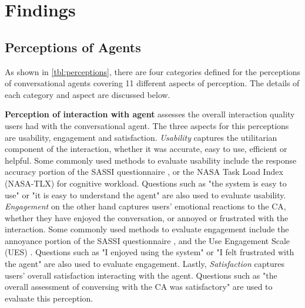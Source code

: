 
\section{Findings}

\subsection{Perceptions of Agents}

As shown in \autoref{tbl:perceptions}, there are four categories defined for the perceptions of conversational agents covering 11 different aspects of perception. The details of each category and aspect are discussed below.

\textbf{Perception of interaction with agent} assesses the overall interaction quality users had with the conversational agent. The three aspects for this perceptions are usability, engagement and satisfaction. \textit{Usability} captures the utilitarian component of the interaction, whether it was accurate, easy to use, efficient or helpful. Some commonly used methods to evaluate usability include the response accuracy portion of the SASSI questionnaire \cite{hone2000towards}, or the NASA Task Load Index (NASA-TLX) \cite{hart1988development} for cognitive workload. Questions such as "the system is easy to use" or "it is easy to understand the agent" are also used to evaluate usability. \textit{Engagement} on the other hand captures users' emotional reactions to the CA, whether they have enjoyed the conversation, or annoyed or frustrated with the interaction. Some commonly used methods to evaluate engagement include the annoyance portion of the SASSI questionnaire \cite{hone2000towards}, and the Use Engagement Scale (UES) \cite{o2018practical}. Questions such as "I enjoyed using the system" or "I felt frustrated with the agent" are also used to evaluate engagement. Lastly, \textit{Satisfaction} captures users' overall satisfaction interacting with the agent. Questions such as "the overall assessment of conversing with the CA was satisfactory" are used to evaluate this perception.

